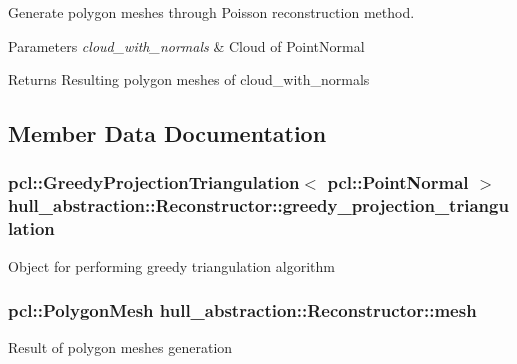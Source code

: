 Generate polygon meshes through Poisson reconstruction method. 


\begin{DoxyParams}{Parameters}
{\em cloud\+\_\+with\+\_\+normals} & Cloud of Point\+Normal \\
\hline
\end{DoxyParams}
\begin{DoxyReturn}{Returns}
Resulting polygon meshes of cloud\+\_\+with\+\_\+normals 
\end{DoxyReturn}


\subsection{Member Data Documentation}
\subsubsection[{\texorpdfstring{greedy\+\_\+projection\+\_\+triangulation}{greedy_projection_triangulation}}]{\setlength{\rightskip}{0pt plus 5cm}pcl\+::\+Greedy\+Projection\+Triangulation$<$ pcl\+::\+Point\+Normal $>$ hull\+\_\+abstraction\+::\+Reconstructor\+::greedy\+\_\+projection\+\_\+triangulation\hspace{0.3cm}{\ttfamily [private]}}\hypertarget{classhull__abstraction_1_1_reconstructor_aeb53b00a5a6300f6fcbef59d6759f01b}{}\label{classhull__abstraction_1_1_reconstructor_aeb53b00a5a6300f6fcbef59d6759f01b}
Object for performing greedy triangulation algorithm 
\subsubsection[{\texorpdfstring{mesh}{mesh}}]{\setlength{\rightskip}{0pt plus 5cm}pcl\+::\+Polygon\+Mesh hull\+\_\+abstraction\+::\+Reconstructor\+::mesh\hspace{0.3cm}{\ttfamily [private]}}\hypertarget{classhull__abstraction_1_1_reconstructor_af0818936b15dd13f3a9fa3e70734cd57}{}\label{classhull__abstraction_1_1_reconstructor_af0818936b15dd13f3a9fa3e70734cd57}
Result of polygon meshes generation 
